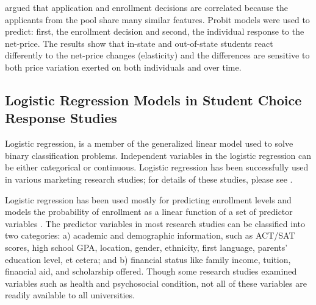 \documentclass[12pt,english]{report}
\begin{document}
\citet{Curs2002} argued that application and enrollment decisions are correlated because the applicants from the pool share
many similar features. Probit models were used to predict: first, the enrollment decision and second, the individual response
to the net-price. The results show that in-state and out-of-state students react differently to the net-price changes (elasticity)
and the differences are sensitive to both price variation exerted on both individuals and over time. 

\subsection{Logistic Regression Models in Student Choice Response Studies}

Logistic regression,  is a member of the generalized linear model used to solve binary classification problems. Independent variables  in the logistic regression can be either categorical or continuous. %
Logistic regression has been successfully used in various marketing research studies; for details of these studies, please see \citep{Hosmer2013}.

\vspace{0.15in}
Logistic regression has been used mostly for predicting enrollment levels and models the probability of enrollment as a linear function of a set of predictor variables \citep{lr_summary}. The predictor  variables in most research studies can be classified into two categories: a) academic and demographic information, such as ACT/SAT scores, high school GPA, location, gender, ethnicity, first language, parents' education level, et cetera; and b) financial status like family income, tuition, financial aid, and scholarship offered. Though some research studies examined variables such as health and psychosocial condition, not all of these variables are readily available to all universities.
\end{document}
